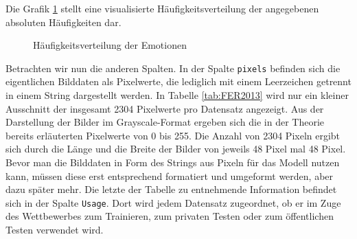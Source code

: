 \documentclass[12pt, a4paper]{report}
\begin{document}
Die Grafik \ref{fig:visualisierungferemotions} stellt eine visualisierte Häufigkeitsverteilung der angegebenen absoluten Häufigkeiten dar.
\begin{figure}[h]
  \centering
{}
  \caption{Häufigkeitsverteilung der Emotionen}
  \label{fig:visualisierungferemotions}
\end{figure}
Betrachten wir nun die anderen Spalten. In der Spalte \texttt{pixels} befinden sich die eigentlichen Bilddaten als Pixelwerte, die lediglich mit einem Leerzeichen getrennt in einem String dargestellt werden. In Tabelle \ref{tab:FER2013} wird nur ein kleiner Ausschnitt der insgesamt 2304 Pixelwerte pro Datensatz angezeigt. Aus der Darstellung der Bilder im Grayscale-Format ergeben sich die in der Theorie bereits erläuterten Pixelwerte von 0 bis 255. Die Anzahl von 2304 Pixeln ergibt sich durch die Länge und die Breite der Bilder von jeweils 48 Pixel mal 48 Pixel. Bevor man die Bilddaten in Form des Strings aus Pixeln für das Modell nutzen kann, müssen diese erst entsprechend formatiert und umgeformt werden, aber dazu später mehr. Die letzte der Tabelle zu entnehmende Information befindet sich in der Spalte \texttt{Usage}. Dort wird jedem Datensatz zugeordnet, ob er im Zuge des Wettbewerbes zum Trainieren, zum privaten Testen oder zum öffentlichen Testen verwendet wird.
\end{document}

